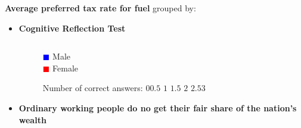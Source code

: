 \documentclass{beamer}              %
\begin{document}
\begin{frame}


    \textbf{Average preferred tax rate for \colorbox{babypink}{fuel}} grouped by:
    \begin{itemize}       
    \item \textbf{\small Cognitive Reflection Test}


    \begin{figure}
      \begin{columns}
  \caption*{ \hspace{0.4cm} \textcolor{blue}{$\blacksquare$} Male\\ \hspace{0.7cm} \textcolor{red}{$\blacksquare$} Female}
   
 \vspace{-0.3cm}   \caption*{\footnotesize \hspace{-4.5cm} Number of correct answers:\hspace{1.1cm} $0$\hspace{0.3cm}$0.5$ \hspace{0.2cm}$1$ \hspace{0.2cm}$1.5$ \hspace{0.2cm}$2$ \hspace{0.2cm}$2.5$\hspace{0.2cm}$3$ }
      \end{columns}
    \end{figure}
    

\vspace{-0.15cm} 
 \item \textbf{\small Ordinary working people do no get their fair share of the nation's wealth}
\end{itemize}
\vspace{-0.5cm}
  \begin{figure}
      \begin{columns}
      

\end{columns}
\end{figure}
\end{frame}
\end{document}
